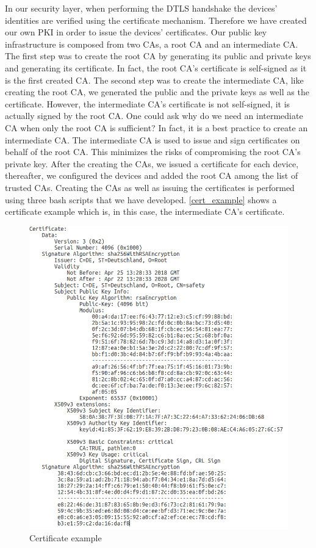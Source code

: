 In our security layer, when performing the DTLS handshake the devices' identities are verified using the certificate mechanism.
Therefore we have created our own \ac{PKI} in order to issue the devices' certificates. Our public key infrastructure
is composed from two \ac{CA}s, a root \ac{CA} and an intermediate \ac{CA}. The first step was to create the root CA by
generating its public and private keys and generating its certificate. In fact, the root CA's certificate is self-signed as it is
the first created CA. The second step was to create the intermediate CA, like creating the root CA, we generated the
public and the private keys as well as the certificate. However, the intermediate CA's certificate is not self-signed, it is actually
signed by the root CA. One could ask why do we need an intermediate CA when only the root CA is sufficient? In fact, it is a best practice to create an intermediate CA. The intermediate CA is used to issue and sign certificates on behalf of
the root CA. This minimizes the risks of compromising the root CA's private key.
After the creating the CAs, we issued a certificate for each device, thereafter, we configured the devices and added the root CA among the list of trusted CAs.
Creating the CAs as well as issuing the certificates is performed using three bash scripts that we have developed.
\autoref{cert_example} shows a certificate example which is, in this case, the intermediate CA's certificate.

\begin{figure}[H]
\centering
\includegraphics[width=12cm,frame]{figures/realization/certificate_example.png}
\caption{Certificate example}\label{cert_example}
\end{figure}

